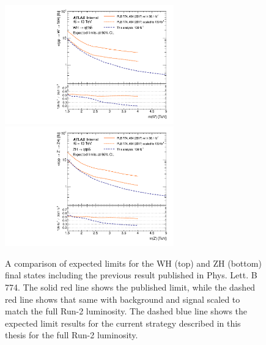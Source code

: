 \begin{figure}[htbp!]
    \begin{center}
        \includegraphics[width=0.65\textwidth]{VHqqbbLimit_WH_2016_2019_v4.pdf} \\
        \includegraphics[width=0.65\textwidth]{VHqqbbLimit_ZH_2016_2019_v4.pdf}
    \end{center}
    \caption{
        A comparison of expected limits for the WH (top) and ZH (bottom) final states including the previous result published in Phys. Lett. B 774.
        The solid red line shows the published limit, while the dashed red line shows that same with background and signal scaled to match the full Run-2 luminosity.
        The dashed blue line shows the expected limit results for the current strategy described in this thesis for the full Run-2 luminosity.
    }
    \label{fig:exp_limit_cmp}
\end{figure}

